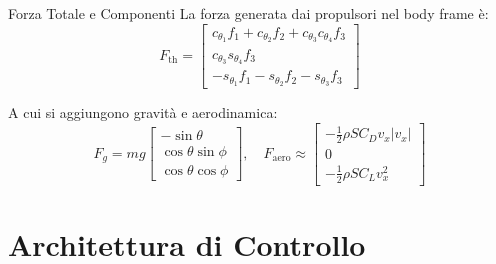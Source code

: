 \documentclass[demo]{beamer} %
\begin{document}
\begin{frame}{Forza Totale e Componenti}
    La forza generata dai propulsori nel body frame è:
    {\footnotesize 
    \begin{equation}
        F_{\mathrm{th}} = 
        \begin{bmatrix}
        c_{\theta_1} f_1 + c_{\theta_2} f_2 + c_{\theta_3} c_{\theta_4} f_3 \\
        c_{\theta_3} s_{\theta_4} f_3 \\
        -s_{\theta_1} f_1 - s_{\theta_2} f_2 - s_{\theta_3} f_3
        \end{bmatrix}
    \end{equation}
    }
    
    A cui si aggiungono gravità e aerodinamica:
    \begin{equation}
        F_g = mg \begin{bmatrix} -\sin\theta \\ \cos\theta \sin\phi \\ \cos\theta \cos\phi \end{bmatrix}, \quad
        F_{\mathrm{aero}} \approx 
        \begin{bmatrix}
            -\frac{1}{2}\rho S C_D v_x |v_x| \\
            0 \\
            -\frac{1}{2}\rho S C_L v_x^2
        \end{bmatrix}
    \end{equation}
\end{frame}

\section{Architettura di Controllo}
\end{document}
